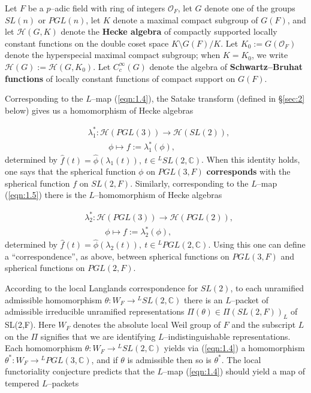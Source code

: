 \documentclass[12pt,letterpaper]{amsart}
\numberwithin{equation}{section}
\theoremstyle{definition}
\theoremstyle{plain}
\providecommand{\cal}{\mathcal}
\def\hhh{{\cal H}}
\def\ccc{\mathbb{C}}
\def\off{{\cal O}_F}
\begin{document}
Let $F$ be a $p$--adic field with ring of integers $\off$, let $G$
denote one of the groups $SL(n)$ or $PGL(n)$, let $K$ denote
a maximal compact subgroup of $G(F)$, and let $\hhh (G,K)$
denote the {\bf Hecke algebra} of compactly
supported locally constant functions on the double coset space
$K\setminus G(F)/K$. Let $K_0:= G(\off )$ denote the hyperspecial
maximal compact subgroup; when $K = K_0$, we write $\hhh (G) := 
\hhh (G,K_0)$. Let $C^\infty_c(G)$ denote the algebra of 
{\bf Schwartz--Bruhat functions} of locally constant functions of
compact support on $G(F)$. 
 
Corresponding to the $L$--map (\ref{eqn:1.4}), the Satake transform (defined 
in \S \ref{sec:2} below) gives us a homomorphism of Hecke algebras

\begin{equation}
\label{eqn:1.6}
\begin{split}
&\lambda_1^* : \hhh (PGL(3)) \rightarrow \hhh (SL(2)),\\
&\ \ \ \ \ \ \ \ \ \ \ \phi \longmapsto f :=\lambda_1^*(\phi),
\end{split}
\end{equation}
determined by 
$\hat{f}(t) = \hat{\phi }(\lambda_1 (t)),\ t \in {^{L}SL(2,\ccc )}$.
When this identity holds, one says that the spherical function $\phi $
on $PGL(3,F)$ {\bf corresponds} with the spherical function $f$ on $SL(2,F)$.
Similarly, corresponding to the $L$--map (\ref{eqn:1.5})
there is the $L$--homomorphism of Hecke algebras

\begin{equation}
\label{eqn:1.7}
\begin{split}
&\lambda_2^* : \hhh (PGL(3)) \rightarrow \hhh (PGL(2)),\\
&\ \ \ \ \ \ \ \ \ \ \ \phi \longmapsto f := \lambda_2^*(\phi),
\end{split}
\end{equation}
determined by $\hat{f}(t) = \hat{\phi }(\lambda_2 (t)),\ t \in 
{^{L}PGL(2,\ccc )}$. Using this one can define a ``correspondence'', as above,
between spherical functions on $PGL(3,F)$ and spherical functions on
$PGL(2,F)$. 
 
According to the local Langlands correspondence for $SL(2)$, to each
unramified admissible homomorphism
$\theta :W_F \rightarrow {^{L}SL(2,\ccc )}$ there is an $L$--packet of
admissible irreducible 
unramified representations $\Pi (\theta )  \in
\Pi (SL(2,F))_L$ of SL(2,F). Here $W_F$ denotes the 
absolute local Weil group of $F$ and the subscript $L$ on the $\Pi$ signifies
that we are identifying $L$--indistinguishable representations. 
Each homomorphism
$\theta : W_F \rightarrow {^{L}SL(2,\ccc )}$ yields via (\ref{eqn:1.4})
a homomorphism $\theta^* : W_F \rightarrow {^{L}PGL(3,\ccc )}$, and if 
$\theta$ is
admissible then so is $\theta^*$. The local functoriality conjecture
predicts that the $L$--map (\ref{eqn:1.4}) 
should yield a map of tempered $L$--packets
\end{document}
